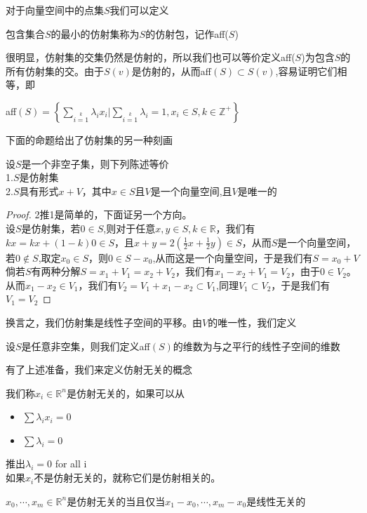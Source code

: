 对于向量空间中的点集$S$我们可以定义
\begin{definition}
包含集合$S$的最小的仿射集称为$S$的仿射包，记作aff($S$)
\end{definition}
很明显，仿射集的交集仍然是仿射的，所以我们也可以等价定义aff($S$)为包含$S$的所有仿射集的交。由于$S(v)$是仿射的，从而aff$(S) \subset S(v)$,容易证明它们相等，即
\begin{proposition}
aff$(S)=\left\{\sum\limits_{i=1}\limits^{k}\lambda_{i}x_{i}|\sum\limits_{i=1}\limits^{k}\lambda_{i}=1,x_{i}\in S,k\in \mathbb{Z}^{+}\right\}$
\end{proposition}
下面的命题给出了仿射集的另一种刻画
\begin{proposition}
\label{chap1_45}
设$S$是一个非空子集，则下列陈述等价\\
1.$S$是仿射集\\
2.$S$具有形式$x+V$，其中$x\in S$且$V$是一个向量空间,且$V$是唯一的
\end{proposition}
\begin{proof}
2推1是简单的，下面证另一个方向。\\
设$S$是仿射集，若$0\in S$,则对于任意$x,y \in S,k\in\mathbb{R}$，我们有$kx=kx+(1-k)0\in S$，且$x+y=2(\frac{1}{2}x+\frac{1}{2}y)\in S$，从而$S$是一个向量空间，若$0\notin S$,取定$x_{0}\in S$，则$0\in S-x_{0}$,从而这是一个向量空间，于是我们有$S=x_{0}+V$\\
倘若$S$有两种分解$S=x_{1}+V_{1}=x_{2}+V_{2}$，我们有$x_{1}-x_{2}+V_{1}=V_{2}$，由于$0\in V_{2}$。从而$x_{1}-x_{2}\in V_{1}$，我们有$V_{2}=V_{1}+x_{1}-x_{2}\subset V_{1}$,同理$V_{1}\subset V_{2}$，于是我们有$V_{1}=V_{2}$
\end{proof}
换言之，我们仿射集是线性子空间的平移。由$V$的唯一性，我们定义
\begin{definition}
设$S$是任意非空集，则我们定义aff$(S)$的维数为与之平行的线性子空间的维数
\end{definition}
有了上述准备，我们来定义仿射无关的概念
\begin{definition}[仿射无关]
我们称$x_{i}\in \mathbb{R}^{n}$是仿射无关的，如果可以从
\begin{itemize}
    \item $\sum \lambda_{i}x_{i}=0$
    \item  $\sum \lambda_{i}=0$
\end{itemize}
推出$\lambda_{i}=0$ for all i\\
如果$x_{i}$不是仿射无关的，就称它们是仿射相关的。
\end{definition}
\begin{proposition}
$x_{0},\cdots,x_{m}\in\mathbb{R}^{n}$是仿射无关的当且仅当$x_{1}-x_{0},\cdots,x_{m}-x_{0}$是线性无关的
\end{proposition}
